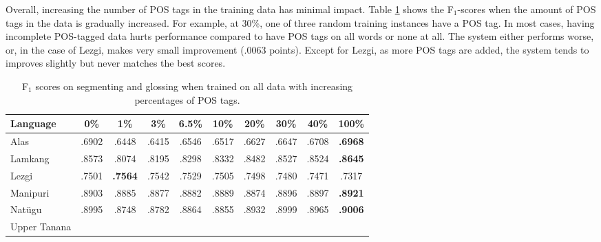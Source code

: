Overall, increasing the number of POS tags in the training data has minimal impact. Table \ref{tab:POSSGpsp} shows the F$_1$-scores when the amount of POS tags in the data is gradually increased. For example, at 30\%, one of three random training instances have a POS tag. In most cases, having incomplete POS-tagged data hurts performance compared to have POS tags on all words or none at all. 
The system either performs worse, or, in the case of Lezgi, makes very small improvement (.0063 points). Except for Lezgi, as more POS tags are added, the system tends to improves slightly but never matches the best scores. 


\begin{table}[htb]
    \centering
    \begin{tabular}{l|ccccccccc}
       \textbf{Language} & \textbf{0\%} & \textbf{1\%} & \textbf{3\%} & \textbf{6.5\%} & \textbf{10\%} & \textbf{20\%} & \textbf{30\%} & \textbf{40\%} & \textbf{100\%}  \\
       \hline
       Alas  & .6902 & .6448  & .6415 & .6546 & .6517 & .6627 & .6647 & .6708 & \textbf{.6968} \\
       \hline
       Lamkang & .8573 & .8074 & .8195 & .8298 & .8332 & .8482 & .8527 & .8524 & \textbf{.8645}  \\
       \hline
       Lezgi  & .7501 & \textbf{.7564} & .7542 & .7529 & .7505 & .7498 & .7480  & .7471 & .7317 \\
       \hline
       Manipuri & .8903 & .8885 & .8877 & .8882 & .8889 & .8874 & .8896 & .8897 & \textbf{.8921} \\
       \hline
       Nat\"ugu & .8995 & .8748 & .8782 & .8864 & .8855 & .8932 & .8999 & .8965 & \textbf{.9006} \\
       \hline
       Upper Tanana &  &  &  &  &  &  &  &  \\
    \end{tabular}
    \caption[Results with More POS Tags]{F$_1$ scores on segmenting and glossing when trained on all data with increasing percentages of POS tags.}
    \label{tab:POSSGpsp}
\end{table}



